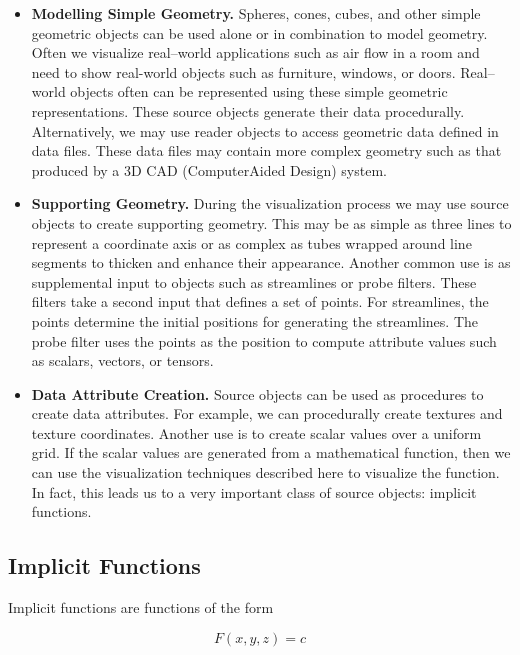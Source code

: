 \begin{itemize}

\item[] \textbf{Modelling Simple Geometry.}
Spheres, cones, cubes, and other simple geometric objects can be used alone or in combination to model geometry. Often we visualize real--world applications such as air flow in a room and need to show real-world objects such as furniture, windows, or doors.
Real--world objects often can be represented using these simple geometric representations. These source objects generate their data procedurally. Alternatively, we may use reader objects to access geometric data defined in data files. These data files may contain more complex geometry such as that produced by a 3D CAD (ComputerAided Design) system.

\item[] \textbf{Supporting Geometry.}
During the visualization process we may use source objects to create supporting geometry. This may be as simple as three lines to represent a coordinate axis or as complex as tubes wrapped around line segments to thicken and enhance their appearance. Another common use is as supplemental input to objects such as streamlines or probe filters. These filters take a second input that defines a set of points. For streamlines, the points determine the initial positions for generating the streamlines. The probe filter uses the points as the position to compute attribute values such as scalars, vectors, or tensors.

\item[] \textbf{Data Attribute Creation.}
Source objects can be used as procedures to create data attributes. For example, we can procedurally create textures and texture coordinates. Another use is to create scalar values over a uniform grid. If the scalar values are generated from a mathematical function, then we can use the visualization techniques described here to visualize the function. In fact, this leads us to a very important class of source objects: implicit functions.

\end{itemize}

\subsection{Implicit Functions}
\label{subsec:implicit_functions}

Implicit functions are functions of the form

\begin{equation}\label{eq:6.11}
F(x,y,z) = c
\end{equation}

